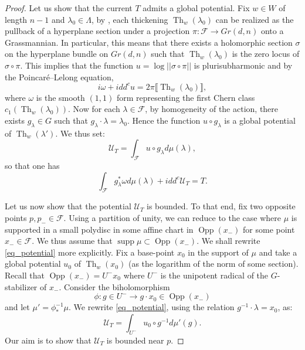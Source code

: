 \documentclass[12pt]{amsbook}%
\theoremstyle{definition}
\theoremstyle{remark}
\numberwithin{section}{chapter}
\numberwithin{subsection}{section}
\numberwithin{figure}{chapter}
\DeclareMathOperator{\Th}{Th}
\DeclareMathOperator{\Opp}{Opp}
\DeclareMathOperator{\supp}{supp}
\newcommand\intcur[1]{\llbracket #1 \rrbracket}
\def\cF{{\mathscr{F}}}
\begin{document}
{{\begin{proof} Let us show that the current $T$  admits a global potential.
Fix $w\in W$ of length $n-1$ and $\lambda_0 \in \Lambda$, by \cite[Proposition 1.4.1]{brion_lectures}, each thickening $\Th_w(\lambda_0)$ can be realized as the pullback of a hyperplane section under a projection $\pi \colon \cF \to Gr(d,n)$ onto a Grassmannian. In particular, this means that there exists a holomorphic section $\sigma $ on the hyperplane bundle on $Gr(d,n)$ such that $\Th_w(\lambda_0) $ is the zero locus of $\sigma \circ \pi$. 
This implies that the function $u=\log ||\sigma\circ \pi||$ is plurisubharmonic and by the Poincar\'e--Lelong equation, 
\begin{equation}
 i \omega +i dd^c  u = 2 \pi \intcur{\Th_w(\lambda_0)} ,
\end{equation} 
where $\omega $ is the smooth $(1,1)$ form representing the first Chern class $c_1(\Th_w(\lambda_0))$. 
Now for each $\lambda \in \cF$, by homogeneity of the action, there exists $g_{\lambda} \in G$ such that $g_{\lambda}\cdot \lambda = \lambda_0$.  Hence the function $u\circ g_\lambda$ is a global potential of $\Th_w(\lambda')$. 
We thus set: 
\begin{equation} \label{eq_potential}
\mathcal{U}_T=\int_{\cF} u \circ g_{\lambda} d\mu(\lambda),
\end{equation}
so that one has
\begin{equation*}
\int_{\cF} g_\lambda^* \omega  d\mu(\lambda) + i dd^c \mathcal{U}_T = T.
\end{equation*}  
\medskip

Let us now show that the potential $\mathcal{U}_T$ is bounded. To that end, fix two opposite points $p, p_- \in \cF$. 
 Using a partition of unity, we can reduce to the case where $\mu$ is supported in a small polydisc in some affine chart in $\Opp(x_-)$ for some point $x_- \in \cF$. We thus assume that $\supp \mu \subset \Opp(x_-)$. 
We shall rewrite \eqref{eq_potential} more explicitly. 
Fix a base-point $x_0$ in the support of $\mu$ and take a global potential $u_0$ of $\Th_w(x_0)$ (as the logarithm of the norm of some section). 
Recall that $\Opp(x_-) = U^- x_0$ where $U^-$ is the unipotent radical of the $G$-stabilizer of $x_-$. Consider the biholomorphism 
$$\phi \colon g\in U^- \to g \cdot x_0 \in \Opp(x_-)$$
and let $\mu' = \phi^{-1}_* \mu$. We rewrite \eqref{eq_potential}, using the relation $g^{-1} \cdot \lambda = x_0$, as: 
 \begin{equation*}
 \mathcal{U}_T = \int_{U^-} u_0 \circ g^{-1} d\mu'(g).
 \end{equation*}
Our aim is to show that $\mathcal{U}_T$ is bounded near $p$. 



\end{proof}}}
\end{document}
